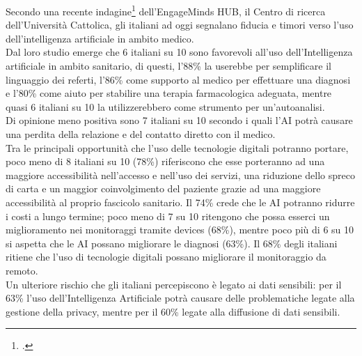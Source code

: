 Secondo una recente indagine\footcite{womak:intelligenza-artificiale-e-medicina} dell'EngageMinds HUB, il Centro di ricerca dell'Università Cattolica, gli italiani ad oggi segnalano fiducia e timori verso l'uso dell'intelligenza artificiale in ambito medico.\\
Dal loro studio emerge che 6 italiani su 10 sono favorevoli all'uso dell'Intelligenza artificiale in ambito sanitario, di questi, l'88\% la userebbe per semplificare il linguaggio dei referti, l'86\% come supporto al medico per effettuare una diagnosi e l'80\% come aiuto per stabilire una terapia farmacologica adeguata, mentre quasi 6 italiani su 10 la utilizzerebbero come strumento per un'autoanalisi.\\
Di opinione meno positiva sono 7 italiani su 10 secondo i quali l'AI potrà causare una perdita della relazione e del contatto diretto con il medico.\\

Tra le principali opportunità che l'uso delle tecnologie digitali potranno portare, poco meno di 8 italiani su 10 (78\%) riferiscono che esse porteranno ad una maggiore accessibilità nell'accesso e nell'uso dei servizi, una riduzione dello spreco di carta e un maggior coinvolgimento del paziente grazie ad una maggiore accessibilità al proprio fascicolo sanitario. Il 74\% crede che le AI potranno ridurre i costi a lungo termine; poco meno di 7 su 10 ritengono che possa esserci un miglioramento nei monitoraggi tramite devices (68\%), mentre poco più di 6 su 10 si aspetta che le AI possano migliorare le diagnosi (63\%). Il 68\% degli italiani ritiene che l'uso di tecnologie digitali possano migliorare il monitoraggio da
remoto.\\

Un ulteriore rischio che gli italiani percepiscono è legato ai dati sensibili: per il 63\% l'uso dell'Intelligenza Artificiale potrà causare delle problematiche legate alla gestione della privacy, mentre per il 60\% legate alla diffusione di dati sensibili.
